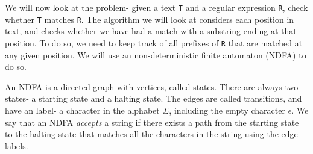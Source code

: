\documentclass[a4paper, openany]{memoir}
\begin{document}
    We will now look at the problem- given a text \texttt{T} and a regular expression \texttt{R}, check whether \texttt{T} matches \texttt{R}. The algorithm we will look at considers each position in text, and checks whether we have had a match with a substring ending at that position. To do so, we need to keep track of all prefixes of \texttt{R} that are matched at any given position. We will use an non-deterministic finite automaton (NDFA) to do so.

    An NDFA is a directed graph with vertices, called states. There are always two states- a starting state and a halting state. The edges are called transitions, and have an label- a character in the alphabet $\Sigma$, including the empty character $\epsilon$. We say that an NDFA \emph{accepts} a string if there exists a path from the starting state to the halting state that matches all the characters in the string using the edge labels.
\end{document}
